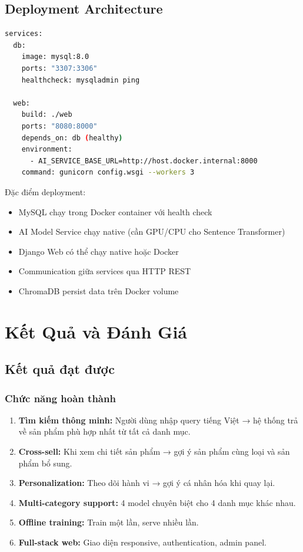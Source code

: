 \documentclass[12pt,a4paper]{report}
\begin{document}
\section{Deployment Architecture}

\begin{lstlisting}[language=bash, caption=Docker Compose configuration]
services:
  db:
    image: mysql:8.0
    ports: "3307:3306"
    healthcheck: mysqladmin ping
    
  web:
    build: ./web
    ports: "8080:8000"
    depends_on: db (healthy)
    environment:
      - AI_SERVICE_BASE_URL=http://host.docker.internal:8000
    command: gunicorn config.wsgi --workers 3
\end{lstlisting}

Đặc điểm deployment:
\begin{itemize}
    \item MySQL chạy trong Docker container với health check
    \item AI Model Service chạy native (cần GPU/CPU cho Sentence Transformer)
    \item Django Web có thể chạy native hoặc Docker
    \item Communication giữa services qua HTTP REST
    \item ChromaDB persist data trên Docker volume
\end{itemize}

\chapter{Kết Quả và Đánh Giá}

\section{Kết quả đạt được}

\subsection{Chức năng hoàn thành}

\begin{enumerate}
    \item \textbf{Tìm kiếm thông minh:} Người dùng nhập query tiếng Việt → hệ thống trả về sản phẩm phù hợp nhất từ tất cả danh mục.
    \item \textbf{Cross-sell:} Khi xem chi tiết sản phẩm → gợi ý sản phẩm cùng loại và sản phẩm bổ sung.
    \item \textbf{Personalization:} Theo dõi hành vi → gợi ý cá nhân hóa khi quay lại.
    \item \textbf{Multi-category support:} 4 model chuyên biệt cho 4 danh mục khác nhau.
    \item \textbf{Offline training:} Train một lần, serve nhiều lần.
    \item \textbf{Full-stack web:} Giao diện responsive, authentication, admin panel.
\end{enumerate}
\end{document}
